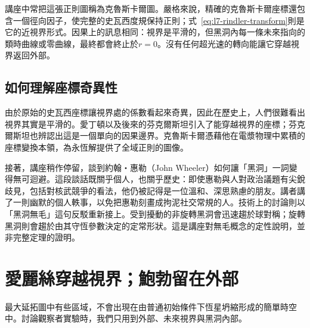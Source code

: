 \begin{classroomqa}
\end{classroomqa}

\begin{classroomqa}
\end{classroomqa}

講座中常把這張正則圖稱為克魯斯卡爾圖。嚴格來說，精確的克魯斯卡爾座標還包含一個徑向因子，使完整的史瓦西度規保持正則；式~\eqref{eq:l7-rindler-transform}則是它的近視界形式。因果上的訊息相同：視界是平滑的，但黑洞內每一條未來指向的類時曲線或零曲線，最終都會終止於\(r=0\)。沒有任何超光速的轉向能讓它穿越視界返回外部。

\subsection{如何理解座標奇異性}

由於原始的史瓦西座標讓視界處的係數看起來奇異，因此在歷史上，人們很難看出視界其實是平滑的。愛丁頓以及後來的芬克爾斯坦引入了能穿越視界的座標；芬克爾斯坦也辨認出這是一個單向的因果邊界。克魯斯卡爾憑藉他在電漿物理中累積的座標變換本領，為永恆解提供了全域正則的圖像。

接著，講座稍作停留，談到約翰・惠勒（John Wheeler）如何讓「黑洞」一詞變得無可迴避。這段談話既關乎個人，也關乎歷史：即使惠勒與人對政治議題有尖銳歧見，包括對核武競爭的看法，他仍被記得是一位溫和、深思熟慮的朋友。講者講了一則幽默的個人軼事，以免把惠勒刻畫成拘泥社交常規的人。技術上的討論則以「黑洞無毛」這句反駁重新接上。受到擾動的非旋轉黑洞會迅速趨於球對稱；旋轉黑洞則會趨於由其守恆參數決定的定常形狀。這是講座對無毛概念的定性說明，並非完整定理的證明。

\section{愛麗絲穿越視界；鮑勃留在外部}

最大延拓圖中有些區域，不會出現在由普通初始條件下恆星坍縮形成的簡單時空中。討論觀察者實驗時，我們只用到外部、未來視界與黑洞內部。

